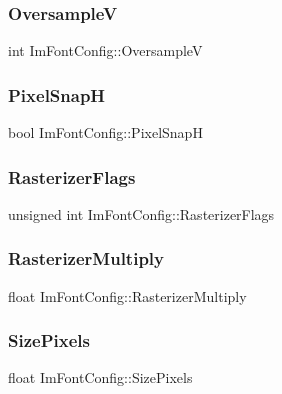 \subsubsection{\texorpdfstring{OversampleV}{OversampleV}}
{\footnotesize\ttfamily int Im\+Font\+Config\+::\+OversampleV}

\hypertarget{struct_im_font_config_a635b5fa03934467891fa949a037b5b89}{}\label{struct_im_font_config_a635b5fa03934467891fa949a037b5b89} 
\subsubsection{\texorpdfstring{Pixel\+SnapH}{PixelSnapH}}
{\footnotesize\ttfamily bool Im\+Font\+Config\+::\+Pixel\+SnapH}

\hypertarget{struct_im_font_config_a80d05eea7733731a3e9ac1d9e905e5b3}{}\label{struct_im_font_config_a80d05eea7733731a3e9ac1d9e905e5b3} 
\subsubsection{\texorpdfstring{Rasterizer\+Flags}{RasterizerFlags}}
{\footnotesize\ttfamily unsigned int Im\+Font\+Config\+::\+Rasterizer\+Flags}

\hypertarget{struct_im_font_config_a9365265cc52098a8ecf89ff47f6106f2}{}\label{struct_im_font_config_a9365265cc52098a8ecf89ff47f6106f2} 
\subsubsection{\texorpdfstring{Rasterizer\+Multiply}{RasterizerMultiply}}
{\footnotesize\ttfamily float Im\+Font\+Config\+::\+Rasterizer\+Multiply}

\hypertarget{struct_im_font_config_a2eff9cc7a11461414402f08ab910d277}{}\label{struct_im_font_config_a2eff9cc7a11461414402f08ab910d277} 
\subsubsection{\texorpdfstring{Size\+Pixels}{SizePixels}}
{\footnotesize\ttfamily float Im\+Font\+Config\+::\+Size\+Pixels}

